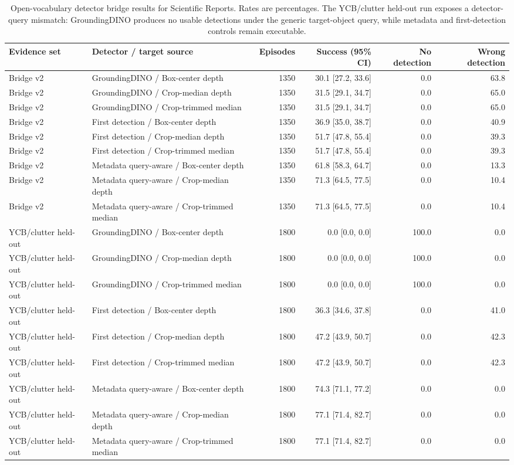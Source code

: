 \begin{table}[t]
\centering
\caption{Open-vocabulary detector bridge results for Scientific Reports. Rates are percentages. The YCB/clutter held-out run exposes a detector-query mismatch: GroundingDINO produces no usable detections under the generic target-object query, while metadata and first-detection controls remain executable.}
\label{tab:scirep-open-vocab-transfer}
\scriptsize
\begin{tabular}{llrrrr}
\toprule
Evidence set & Detector / target source & Episodes & Success (95\% CI) & No detection & Wrong detection \\
\midrule
Bridge v2 & GroundingDINO / Box-center depth & 1350 & 30.1 [27.2, 33.6] & 0.0 & 63.8 \\
Bridge v2 & GroundingDINO / Crop-median depth & 1350 & 31.5 [29.1, 34.7] & 0.0 & 65.0 \\
Bridge v2 & GroundingDINO / Crop-trimmed median & 1350 & 31.5 [29.1, 34.7] & 0.0 & 65.0 \\
Bridge v2 & First detection / Box-center depth & 1350 & 36.9 [35.0, 38.7] & 0.0 & 40.9 \\
Bridge v2 & First detection / Crop-median depth & 1350 & 51.7 [47.8, 55.4] & 0.0 & 39.3 \\
Bridge v2 & First detection / Crop-trimmed median & 1350 & 51.7 [47.8, 55.4] & 0.0 & 39.3 \\
Bridge v2 & Metadata query-aware / Box-center depth & 1350 & 61.8 [58.3, 64.7] & 0.0 & 13.3 \\
Bridge v2 & Metadata query-aware / Crop-median depth & 1350 & 71.3 [64.5, 77.5] & 0.0 & 10.4 \\
Bridge v2 & Metadata query-aware / Crop-trimmed median & 1350 & 71.3 [64.5, 77.5] & 0.0 & 10.4 \\
YCB/clutter held-out & GroundingDINO / Box-center depth & 1800 & 0.0 [0.0, 0.0] & 100.0 & 0.0 \\
YCB/clutter held-out & GroundingDINO / Crop-median depth & 1800 & 0.0 [0.0, 0.0] & 100.0 & 0.0 \\
YCB/clutter held-out & GroundingDINO / Crop-trimmed median & 1800 & 0.0 [0.0, 0.0] & 100.0 & 0.0 \\
YCB/clutter held-out & First detection / Box-center depth & 1800 & 36.3 [34.6, 37.8] & 0.0 & 41.0 \\
YCB/clutter held-out & First detection / Crop-median depth & 1800 & 47.2 [43.9, 50.7] & 0.0 & 42.3 \\
YCB/clutter held-out & First detection / Crop-trimmed median & 1800 & 47.2 [43.9, 50.7] & 0.0 & 42.3 \\
YCB/clutter held-out & Metadata query-aware / Box-center depth & 1800 & 74.3 [71.1, 77.2] & 0.0 & 0.0 \\
YCB/clutter held-out & Metadata query-aware / Crop-median depth & 1800 & 77.1 [71.4, 82.7] & 0.0 & 0.0 \\
YCB/clutter held-out & Metadata query-aware / Crop-trimmed median & 1800 & 77.1 [71.4, 82.7] & 0.0 & 0.0 \\
\bottomrule
\end{tabular}
\end{table}
